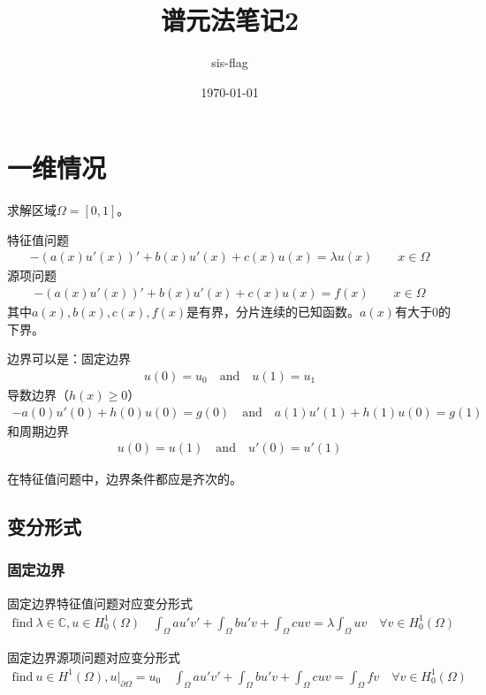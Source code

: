 \documentclass[12pt,a4paper]{article}
\title{谱元法笔记2}
\author{sis-flag}
\date{\today}
\begin{document}
\maketitle

\section{一维情况}

求解区域$\Omega = [0,1]$。

特征值问题
\begin{align*}
- (a(x) u'(x))' + b(x) u'(x) + c(x) u(x) = \lambda u(x) \qquad x \in \Omega
\end{align*}
源项问题
\begin{align*}
- (a(x) u'(x))' + b(x) u'(x) + c(x) u(x) = f(x) \qquad x \in \Omega
\end{align*}
其中$a(x), b(x), c(x), f(x)$是有界，分片连续的已知函数。$a(x)$有大于0的下界。

边界可以是：固定边界
\begin{align*}
u(0) = u_0 \quad \text{and} \quad u(1) = u_1
\end{align*}
导数边界（$h(x) \geq 0$）
\begin{align*}
-a(0) u'(0) + h(0) u(0) = g(0) \quad \text{and} \quad a(1) u'(1) + h(1) u(0) = g(1)
\end{align*}
和周期边界
\begin{align*}
u(0) = u(1) \quad \text{and} \quad u'(0) = u'(1)
\end{align*}

在特征值问题中，边界条件都应是齐次的。


\subsection{变分形式}

\subsubsection{固定边界}

固定边界特征值问题对应变分形式
\begin{align*}
\text{find} \ \lambda \in \mathbb{C}, u \in H_0^1(\Omega) \quad \int_{\Omega} a u' v' + \int_{\Omega} b u' v + \int_{\Omega} c u v = \lambda \int_{\Omega} u v \quad \forall v \in H_0^1(\Omega)
\end{align*}

固定边界源项问题对应变分形式
\begin{align*}
\text{find} \ u \in H^1(\Omega), u|_{\partial \Omega} = u_0 \quad \int_{\Omega} a u' v' + \int_{\Omega} b u' v + \int_{\Omega} c u v = \int_{\Omega} f v \quad \forall v \in H_0^1(\Omega)
\end{align*}
\end{document}
